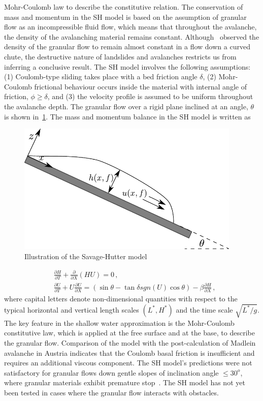 Mohr-Coulomb law to describe the constitutive relation. The conservation of 
mass and momentum in the SH model is based on the assumption of granular flow 
as an incompressible fluid flow, which means that throughout the avalanche, the 
density of the avalanching material remains constant. 
Although~\citet{Hutter1995} observed the density of the granular flow to remain 
almost constant in a flow down a curved chute, the destructive nature of 
landslides and avalanches restricts us from inferring a conclusive result. The 
SH model involves the following assumptions: (1) Coulomb-type sliding takes 
place with a bed friction angle $\delta$, (2) Mohr-Coulomb frictional behaviour 
occurs inside the material with internal angle of friction, $\phi \ge \delta$, 
and (3) the velocity profile is assumed to be uniform throughout the avalanche 
depth. The granular flow over a rigid plane inclined at an angle, $\theta$ is 
shown in~\cref{fig:SH}. The mass and momentum balance in the SH model is 
written as
%
\begin{figure}[htbp]
\centering
\includegraphics[width=0.95\textwidth]{SH}
\caption{Illustration of the Savage-Hutter model}
\label{fig:SH}
\end{figure}
%
\begin{align}
&\frac{\partial \textit{H}}{\partial \textit{T}} + \frac{\partial}{\partial 
\textit{X}} (\textit{HU})  =  0 \,, \\
&\frac{\partial \textit{U}}{\partial \textit{T}} + \textit{U} \frac{\partial 
\textit{U}}{\partial \textit{X}}  = (\sin \theta - \tan \delta 
\textit{sgn}(\textit{U}) \cos \theta) -\beta \frac{\partial 
\textit{H}}{\partial \textit{X}} \,,
\end{align}
%
where capital letters denote non-dimensional quantities with respect to the 
typical horizontal and vertical length scales $(\textit{L}^{*},\textit{H}^{*})$ 
and the time scale $\sqrt{\textit{L}^{*}/\textit{g}}$. The key feature in the 
shallow water approximation is the Mohr-Coulomb constitutive law, which is 
applied at the free surface and at the base, to describe the granular flow. 
Comparison of the model with the post-calculation of Madlein avalanche in 
Austria indicates that the Coulomb basal friction is insufficient and requires 
an additional viscous component. The SH model's predictions were not 
satisfactory for granular flows down gentle slopes of inclination angle $\le 
30^{o}$, where granular materials exhibit premature stop~\citep{Hutter2005}. 
The SH model has not yet been tested in cases where the granular flow interacts 
with obstacles.

